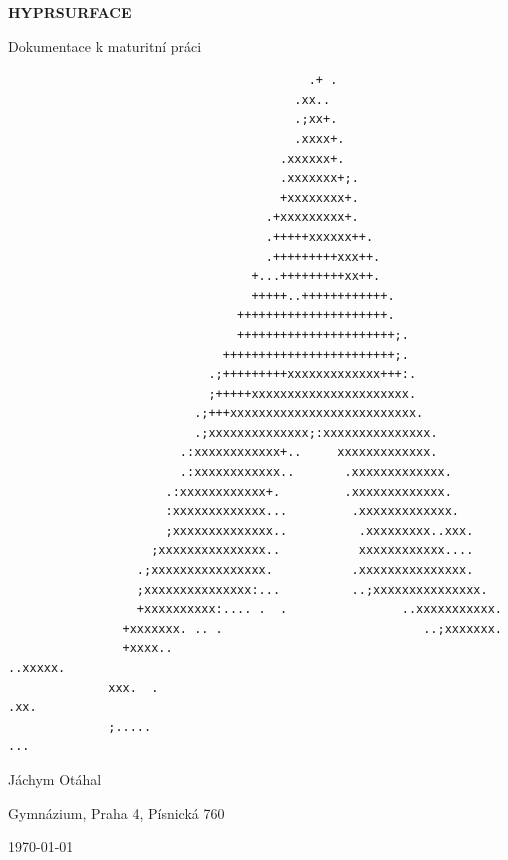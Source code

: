 \documentclass[12pt,a4paper]{article}
\begin{document}
\begin{titlepage}
    \centering
    {\Huge \textbf{HYPRSURFACE}\par}
    \vspace{2cm}
    {\Large Dokumentace k maturitní práci\par}
    \vfill

    \begin{center}
    \begin{verbatim}
                                          .+ .                           
                                        .xx..                           
                                        .;xx+.                           
                                        .xxxx+.                          
                                      .xxxxxx+.                         
                                      .xxxxxxx+;.                        
                                      +xxxxxxxx+.                        
                                    .+xxxxxxxxx+.                       
                                    .+++++xxxxxx++.                      
                                    .+++++++++xxx++.                     
                                  +...+++++++++xx++.                    
                                  +++++..++++++++++++.                   
                                +++++++++++++++++++++.                  
                                ++++++++++++++++++++++;.                 
                              ++++++++++++++++++++++++;.                
                            .;+++++++++xxxxxxxxxxxxx+++:.               
                            ;+++++xxxxxxxxxxxxxxxxxxxxxx.               
                          .;+++xxxxxxxxxxxxxxxxxxxxxxxxxx.              
                          .;xxxxxxxxxxxxxx;:xxxxxxxxxxxxxxx.             
                        .:xxxxxxxxxxxx+..     xxxxxxxxxxxxx.            
                        .:xxxxxxxxxxxx..       .xxxxxxxxxxxxx.           
                      .:xxxxxxxxxxxx+.         .xxxxxxxxxxxxx.          
                      :xxxxxxxxxxxxx...         .xxxxxxxxxxxxx.         
                      ;xxxxxxxxxxxxxx..          .xxxxxxxxx..xxx.        
                    ;xxxxxxxxxxxxxxx..           xxxxxxxxxxxx....       
                  .;xxxxxxxxxxxxxxxx.           .xxxxxxxxxxxxxxx.       
                  ;xxxxxxxxxxxxxxx:...          ..;xxxxxxxxxxxxxxx.     
                  +xxxxxxxxxx:.... .  .                ..xxxxxxxxxxx.    
                +xxxxxxx. .. .                            ..;xxxxxxx.   
                +xxxx..                                        ..xxxxx.  
              xxx.  .                                              .xx. 
              ;.....                                                  ...
    \end{verbatim}
    \end{center}
    \vfill
    
    {\large Jáchym Otáhal\par} %
    {\large Gymnázium, Praha 4, Písnická 760\par}
    {\large \today} %
\end{titlepage}
\end{document}
